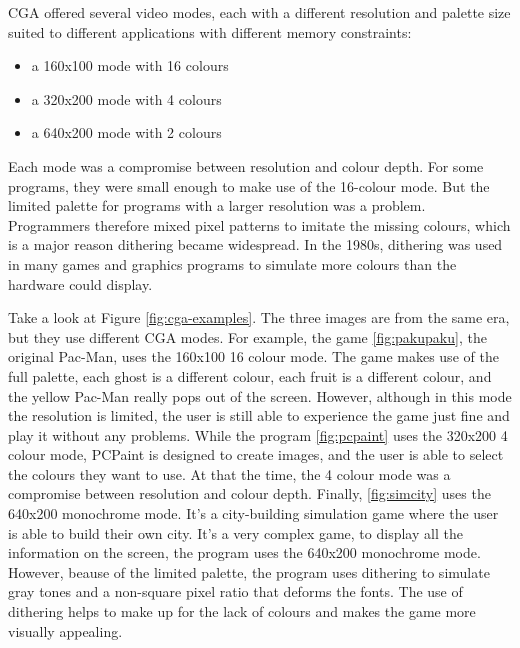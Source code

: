 \documentclass[10pt,a4paper]{article}
\begin{document}
CGA offered several video modes, each with a different resolution and palette size
suited to different applications with different memory constraints:
\begin{itemize}
  \item a 160x100 mode with 16 colours
  \item a 320x200 mode with 4 colours
  \item a 640x200 mode with 2 colours
\end{itemize}

Each mode was a compromise between resolution and colour depth.
For some programs, they were small enough to make use of the 16-colour mode.
But the limited palette for programs with a larger resolution was a problem.
Programmers therefore mixed pixel patterns to imitate the missing colours,
which is a major reason dithering became widespread.
In the 1980s, dithering was used in many games and graphics programs to
simulate more colours than the hardware could display.

\smallskip   %

Take a look at Figure \ref{fig:cga-examples}.
The three images are from the same era, but they use different CGA modes.
For example, the game \ref{fig:pakupaku}, the original Pac-Man, uses the 160x100 16 colour mode.
The game makes use of the full palette, each ghost is a different colour, each fruit is a different colour,
and the yellow Pac-Man really pops out of the screen. However, although in this mode the resolution
is limited, the user is still able to experience the game just fine and play it without any problems.
While the program \ref{fig:pcpaint} uses the 320x200 4 colour mode, PCPaint is designed
to create images, and the user is able to select the colours they want to use.
At that the time, the 4 colour mode was a compromise between resolution and colour depth.
Finally, \ref{fig:simcity} uses the 640x200 monochrome mode.
It's a city-building simulation game where the user is able to build their own city.
It's a very complex game, to display all the information on the screen, the program uses the 640x200 monochrome mode.
However, beause of the limited palette, the program uses dithering to simulate gray tones
and a non-square pixel ratio that deforms the fonts.
The use of dithering helps to make up for the lack of colours and makes the game more visually appealing.

\end{document}
